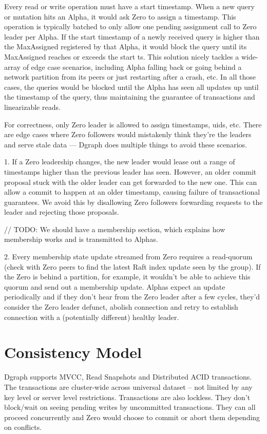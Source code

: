 \documentclass[letterpaper,twocolumn,10pt]{article}
\begin{document}
Every read or write operation must have a start timestamp. When a new query or
mutation hits an Alpha, it would ask Zero to assign a timestamp. This operation
is typically batched to only allow one pending assignment call to Zero leader
per Alpha. If the start timestamp of a newly received query is higher than the
MaxAssigned registered by that Alpha, it would block the query until its
MaxAssigned reaches or exceeds the start ts. This solution nicely tackles a
wide-array of edge case scenarios, including Alpha falling back or going behind
a network partition from its peers or just restarting after a crash, etc. In all
those cases, the queries would be blocked until the Alpha has seen all updates
up until the timestamp of the query, thus maintaining the guarantee of
transactions and linearizable reads.

For correctness, only Zero leader is allowed to assign timestamps, uids, etc.
There are edge cases where Zero followers would mistakenly think they're the
leaders and serve stale data --- Dgraph does multiple things to avoid these
scenarios.

1. If a Zero leadership changes, the new leader would lease out a range of
timestamps higher than the previous leader has seen.  However, an older commit
proposal stuck with the older leader can get forwarded to the new one. This can
allow a commit to happen at an older timestamp, causing failure of transactional
guarantees. We avoid this by disallowing Zero followers forwarding requests to
the leader and rejecting those proposals.

// TODO: We should have a membership section, which explains how membership
works and is transmitted to Alphas.

2. Every membership state update streamed from Zero requires a read-quorum
(check with Zero peers to find the latest Raft index update seen by the group).
If the Zero is behind a partition, for example, it wouldn't be able to achieve
this quorum and send out a membership update. Alphas expect an update
periodically and if they don't hear from the Zero leader after a few cycles,
they'd consider the Zero leader defunct, abolish connection and retry to
establish connection with a (potentially different) healthy leader.

\section{Consistency Model}

Dgraph supports MVCC, Read Snapshots and Distributed ACID transactions.  The
transactions are cluster-wide across universal dataset -- not limited by any key
level or server level restrictions. Transactions are also lockless.  They don’t
block/wait on seeing pending writes by uncommitted transactions. They can all
proceed concurrently and Zero would choose to commit or abort them depending on
conflicts.
\end{document}

